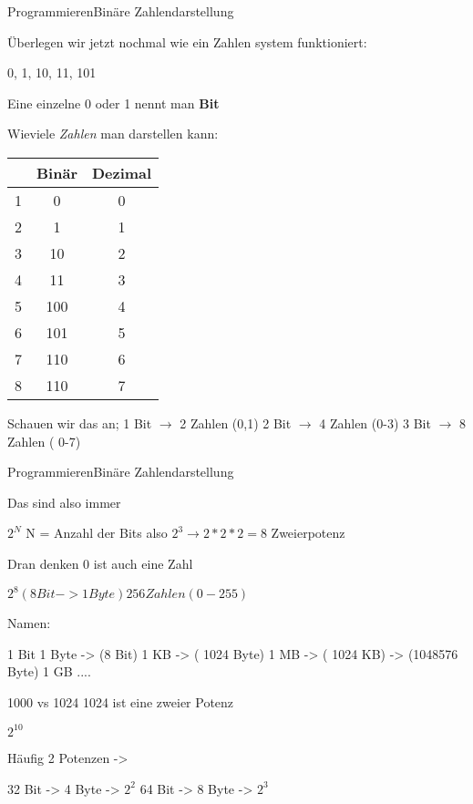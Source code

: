 \begin{frame}{Programmieren}{Binäre Zahlendarstellung}

		Überlegen wir jetzt nochmal wie ein Zahlen system funktioniert:
		
		0, 1, 10, 11, 101
		
		Eine einzelne 0 oder 1 nennt man \textbf{Bit}


		Wieviele \textit{Zahlen} man darstellen kann:

		\begin{tabular}{|l||c|c|}
		\hline   & Binär & Dezimal \\ 
		\hline 1 & 0 & 0 \\ 
		\hline 2 & 1 & 1 \\ 
		\hline 3 & 10 & 2 \\ 
		\hline 4 & 11 & 3 \\ 
		\hline 5 & 100 & 4 \\ 
		\hline 6 & 101 & 5 \\ 
		\hline 7 & 110 & 6 \\ 
		\hline 8 & 110 & 7 \\
		\hline 
		\end{tabular} 
		
		Schauen wir das an;
		1 Bit $\rightarrow$ 2 Zahlen (0,1)
		2 Bit $\rightarrow$ 4 Zahlen (0-3)
		3 Bit $\rightarrow$ 8 Zahlen ( 0-7)
		

\end{frame}

\begin{frame}{Programmieren}{Binäre Zahlendarstellung}

		Das sind also immer
		
		$2^N$ N = Anzahl der Bits also $ 2^3 \rightarrow 2 * 2 * 2 = 8 $
		Zweierpotenz
		
		Dran denken 0 ist auch eine Zahl
		
		$2^8 ( 8 Bit -> 1 Byte) 256 Zahlen ( 0-255)$
		
		Namen:
		
		1 Bit
		1 Byte -> (8 Bit)
		1 KB -> ( 1024 Byte)
		1 MB -> ( 1024 KB) -> (1048576 Byte)
		1 GB
		....
		
		1000 vs 1024 
		1024 ist eine zweier Potenz
		
		$2^10$
		
		Häufig 2 Potenzen ->
		
		32 Bit -> 4 Byte -> $2^2$
		64 Bit -> 8 Byte -> $2^3$
		
		
\end{frame}


